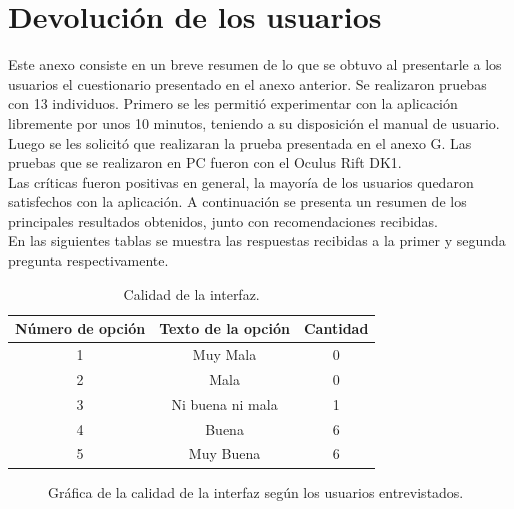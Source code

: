 \documentclass[12pt]{article}
\begin{document}
\section{Devolución de los usuarios}
Este anexo consiste en un breve resumen de lo que se obtuvo al presentarle a los usuarios el cuestionario presentado en el anexo anterior. Se realizaron pruebas con 13 individuos. Primero se les permitió experimentar con la aplicación libremente por unos 10 minutos, teniendo a su disposición el manual de usuario. Luego se les solicitó que realizaran la prueba presentada en el anexo G. Las pruebas que se realizaron en PC fueron con el Oculus Rift DK1.
\\Las críticas fueron positivas en general, la mayoría de los usuarios quedaron satisfechos con la aplicación. A continuación se presenta un resumen de los principales resultados obtenidos, junto con recomendaciones recibidas.
\\En las siguientes tablas se muestra las respuestas recibidas a la primer y segunda pregunta respectivamente.
\begin{table}[h!]
  \centering
  \label{tab:table1}
  \begin{tabular}{ccc}
    \toprule
    Número de opción &  Texto de la opción &Cantidad\\
    \midrule
    1 & Muy Mala & 0 \\
    2 & Mala & 0 \\
    3 & Ni buena ni mala & 1 \\
    4 & Buena & 6\\
    5 & Muy Buena & 6\\
    \bottomrule
  \end{tabular}
  \caption{Calidad de la interfaz.}
\end{table}

  \begin{figure}[!ht]
    \centering
    \caption{Gráfica de la calidad de la interfaz según los usuarios entrevistados.}
    \label{fig:data}
  \end{figure}
\end{document}
